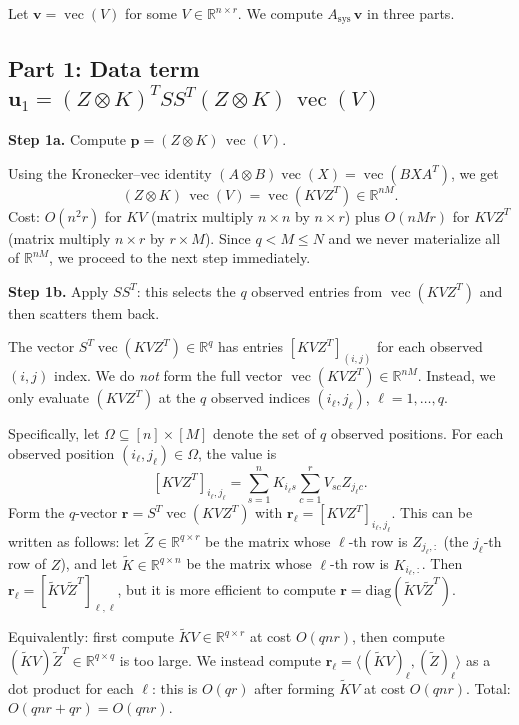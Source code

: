 \documentclass[11pt]{article}
\theoremstyle{definition}
\DeclareMathOperator{\vecop}{vec}
\newcommand{\R}{\mathbb{R}}
\begin{document}
Let $\mathbf{v} = \vecop(V)$ for some $V \in \R^{n \times r}$. We compute $A_{\mathrm{sys}}\,\mathbf{v}$ in three parts.

\subsection{Part 1: Data term $\mathbf{u}_1 = (Z \otimes K)^T S S^T (Z \otimes K)\,\vecop(V)$}

\textbf{Step 1a.} Compute $\mathbf{p} = (Z \otimes K)\,\vecop(V)$.

Using the Kronecker--vec identity $(A \otimes B)\vecop(X) = \vecop(BXA^T)$, we get
\[
  (Z \otimes K)\,\vecop(V) = \vecop(K V Z^T) \in \R^{nM}.
\]
Cost: $O(n^2 r)$ for $KV$ (matrix multiply $n \times n$ by $n \times r$) plus $O(nMr)$ for $KVZ^T$ (matrix multiply $n \times r$ by $r \times M$). Since $q < M \leq N$ and we never materialize all of $\R^{nM}$, we proceed to the next step immediately.

\textbf{Step 1b.} Apply $SS^T$: this selects the $q$ observed entries from $\vecop(KVZ^T)$ and then scatters them back.

The vector $S^T \vecop(KVZ^T) \in \R^q$ has entries $[KVZ^T]_{(i,j)}$ for each observed $(i,j)$ index. We do \emph{not} form the full vector $\vecop(KVZ^T) \in \R^{nM}$. Instead, we only evaluate $(KVZ^T)$ at the $q$ observed indices $(i_\ell, j_\ell)$, $\ell = 1, \ldots, q$.

Specifically, let $\Omega \subseteq [n] \times [M]$ denote the set of $q$ observed positions. For each observed position $(i_\ell, j_\ell) \in \Omega$, the value is
\[
  [KVZ^T]_{i_\ell, j_\ell} = \sum_{s=1}^n K_{i_\ell s} \sum_{c=1}^r V_{sc} Z_{j_\ell c}.
\]
Form the $q$-vector $\mathbf{r} = S^T\vecop(KVZ^T)$ with $\mathbf{r}_\ell = [KVZ^T]_{i_\ell, j_\ell}$. This can be written as follows: let $\tilde{Z} \in \R^{q \times r}$ be the matrix whose $\ell$-th row is $Z_{j_\ell,:}$ (the $j_\ell$-th row of $Z$), and let $\tilde{K} \in \R^{q \times n}$ be the matrix whose $\ell$-th row is $K_{i_\ell,:}$. Then $\mathbf{r}_\ell = [\tilde{K}V\tilde{Z}^T]_{\ell,\ell}$, but it is more efficient to compute $\mathbf{r} = \mathrm{diag}(\tilde{K}V\tilde{Z}^T)$.

Equivalently: first compute $\tilde{K}V \in \R^{q \times r}$ at cost $O(qnr)$, then compute $(\tilde{K}V)\tilde{Z}^T \in \R^{q \times q}$ is too large. We instead compute $\mathbf{r}_\ell = \langle (\tilde{K}V)_\ell, (\tilde{Z})_\ell \rangle$ as a dot product for each $\ell$: this is $O(qr)$ after forming $\tilde{K}V$ at cost $O(qnr)$. Total: $O(qnr + qr) = O(qnr)$.
\end{document}
